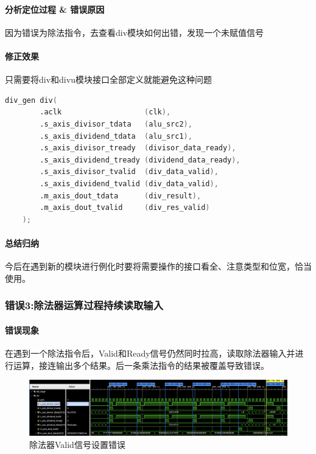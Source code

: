 \documentclass[UTF-8,twoside,c5size]{ctexart}
\begin{document}
	\paragraph{分析定位过程 \& 错误原因}\hfill
	
	因为错误为除法指令，去查看div模块如何出错，发现一个未赋值信号
	
	\paragraph{修正效果}\hfill
	
	只需要将div和divu模块接口全部定义就能避免这种问题
	
	\begin{lstlisting}[language=verilog]
	div_gen div(
		.aclk                   (clk),
		.s_axis_divisor_tdata   (alu_src2),
		.s_axis_dividend_tdata  (alu_src1),
		.s_axis_divisor_tready  (divisor_data_ready),
		.s_axis_dividend_tready (dividend_data_ready),
		.s_axis_divisor_tvalid  (div_data_valid),
		.s_axis_dividend_tvalid (div_data_valid),
		.m_axis_dout_tdata      (div_result),
		.m_axis_dout_tvalid     (div_res_valid)
	);
	\end{lstlisting}

	\paragraph{总结归纳}\hfill
	
	今后在遇到新的模块进行例化时要将需要操作的接口看全、注意类型和位宽，恰当使用。
	
	\subsubsection{错误\textbf{3:}除法器运算过程持续读取输入}
	
	\paragraph{错误现象}\hfill
	
	在遇到一个除法指令后，Valid和Ready信号仍然同时拉高，读取除法器输入并进行运算，接连输出多个结果。后一条乘法指令的结果被覆盖导致错误。
	
	\begin{figure}[h]
		\centering
		\includegraphics[width=1\linewidth]{valid_error.png}
		\caption[valid\_errpr]{除法器Valid信号设置错误}
		\label{fig:validerror}
	\end{figure}
	
\end{document}
